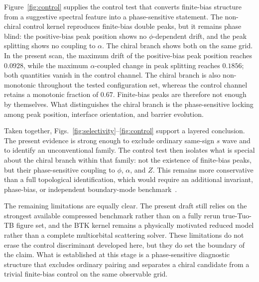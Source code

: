 \documentclass[aps,prl,twocolumn,superscriptaddress,longbibliography]{revtex4-2}
\begin{document}
Figure~\ref{fig:control} supplies the control test that converts finite-bias
structure from a suggestive spectral feature into a phase-sensitive statement.
The non-chiral control kernel reproduces finite-bias double peaks, but it
remains phase blind: the positive-bias peak position shows no $\phi$-dependent
drift, and the peak splitting shows no coupling to $\alpha$. The chiral branch
shows both on the same grid. In the present scan, the maximum drift of the
positive-bias peak position reaches $0.0928$, while the maximum
$\alpha$-coupled change in peak splitting reaches $0.1856$; both quantities
vanish in the control channel. The chiral branch is also non-monotonic
throughout the tested configuration set, whereas the control channel retains a
monotonic fraction of $0.67$. Finite-bias peaks are therefore not enough by
themselves. What distinguishes the chiral branch is the phase-sensitive locking
among peak position, interface orientation, and barrier evolution.

Taken together, Figs.~\ref{fig:selectivity}--\ref{fig:control} support a
layered conclusion. The present evidence is strong enough to exclude ordinary
same-sign $s$ wave and to identify an unconventional family. The control test
then isolates what is special about the chiral branch within that family: not
the existence of finite-bias peaks, but their phase-sensitive coupling to
$\phi$, $\alpha$, and $Z$. This remains more conservative than a full
topological identification, which would require an additional invariant,
phase-bias, or independent boundary-mode benchmark~\cite{ReadGreen2000,FuBerg2010,SatoAndo2017}.

The remaining limitations are equally clear. The present draft still relies on
the strongest available compressed benchmark rather than on a fully rerun
true-Tuo-TB figure set, and the BTK kernel remains a physically motivated
reduced model rather than a complete multiorbital scattering solver. These
limitations do not erase the control discriminant developed here, but they do
set the boundary of the claim. What is established at this stage is a
phase-sensitive diagnostic structure that excludes ordinary pairing and
separates a chiral candidate from a trivial finite-bias control on the same
observable grid.



\end{document}
